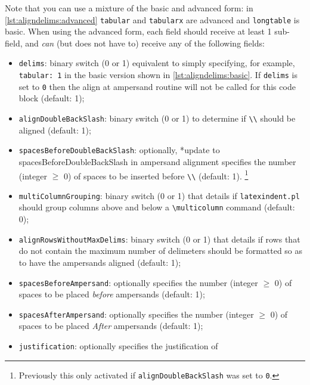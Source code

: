 	Note that you can use a mixture of the basic and advanced form: in
	\cref{lst:aligndelims:advanced} \texttt{tabular} and \texttt{tabularx} are advanced
	and \texttt{longtable} is basic. When using the advanced form, each field should
	receive at least 1 sub-field, and \emph{can}
	(but does not have to) receive any of the following
	fields:
	\begin{itemize}
		\item \texttt{delims}: binary switch (0 or 1) equivalent to simply specifying, for
		      example, \texttt{tabular: 1} in the basic version shown in \cref{lst:aligndelims:basic}. If
		      \texttt{delims} is set to \texttt{0} then the align at ampersand
		      routine will not be called for this code block (default: 1);
		\item \texttt{alignDoubleBackSlash}: binary switch (0 or 1) to determine if \lstinline!\\!
		      should be aligned (default: 1);
		\item \texttt{spacesBeforeDoubleBackSlash}: optionally,%
		      *{update to spacesBeforeDoubleBackSlash in ampersand alignment} specifies the number (integer $\geq$ 0) of spaces
		      to be inserted before \lstinline!\\! (default: 1). \footnote{Previously this only activated if \texttt{alignDoubleBackSlash} was set to \texttt{0}.}
		\item {} \texttt{multiColumnGrouping}: binary switch (0 or 1) that details if
		      \texttt{latexindent.pl} should group columns
		      above and below a \lstinline!\multicolumn! command (default: 0);
		\item {} \texttt{alignRowsWithoutMaxDelims}: binary switch (0 or 1) that details if
		      rows that do not contain the maximum number of delimeters should be formatted so as to
		      have the ampersands aligned (default: 1);
		\item {}\texttt{spacesBeforeAmpersand}: optionally specifies the number (integer
		      $\geq$ 0) of
		      spaces to be placed \emph{before} ampersands (default: 1);
		\item {}\texttt{spacesAfterAmpersand}: optionally specifies the number (integer
		      $\geq$ 0) of
		      spaces to be placed \emph{After} ampersands (default: 1);
		\item {}\texttt{justification}: optionally specifies the justification of

\end{itemize}
